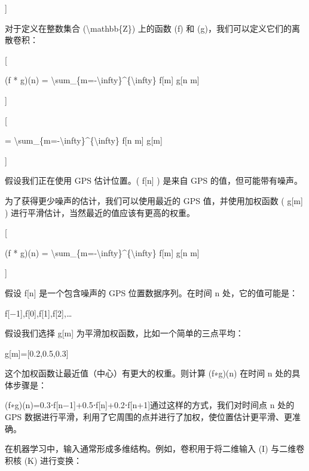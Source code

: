 {]}


对于定义在整数集合 (\textbackslash mathbb\{Z\}) 上的函数 (f) 和
(g)，我们可以定义它们的离散卷积：

{[}

(f * g)(n) =
\textbackslash sum\_\{m=-\textbackslash infty\}\^{}\{\textbackslash infty\}
f{[}m{]} g{[}n m{]}

{]}

{[}

=
\textbackslash sum\_\{m=-\textbackslash infty\}\^{}\{\textbackslash infty\}
f{[}n m{]} g{[}m{]}

{]}


假设我们正在使用 GPS 估计位置。( f{[}n{]} ) 是来自 GPS
的值，但可能带有噪声。

为了获得更少噪声的估计，我们可以使用最近的 GPS 值，并使用加权函数 (
g{[}m{]} ) 进行平滑估计，当然最近的值应该有更高的权重。

{[}

(f * g)(n) =
\textbackslash sum\_\{m=-\textbackslash infty\}\^{}\{\textbackslash infty\}
f{[}m{]} g{[}n m{]}

{]}


假设 f{[}n{]} 是一个包含噪声的 GPS 位置数据序列。在时间 n
处，它的值可能是：

f{[}−1{]},f{[}0{]},f{[}1{]},f{[}2{]},\ldots{}

假设我们选择 g{[}m{]} 为平滑加权函数，比如一个简单的三点平均：

g{[}m{]}={[}0.2,0.5,0.3{]}

这个加权函数让最近值（中心）有更大的权重。则计算 (f∗g)(n) 在时间 n
处的具体步骤是：

(f∗g)(n)=0.3⋅f{[}n−1{]}+0.5⋅f{[}n{]}+0.2⋅f{[}n+1{]}通过这样的方式，我们对时间点
n 处的 GPS
数据进行平滑，利用了它周围的点并进行了加权，使位置估计更平滑、更准确。

在机器学习中，输入通常形成多维结构。例如，卷积用于将二维输入 (I)
与二维卷积核 (K) 进行变换：

